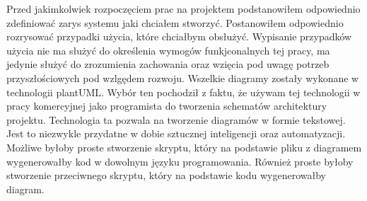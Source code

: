 Przed jakimkolwiek rozpoczęciem prac na projektem podstanowiłem odpowiednio zdefiniować zarys systemu jaki chciałem stworzyć.
Postanowiłem odpowiednio rozrysować przypadki użycia, które chciałbym obsłużyć.
Wypisanie przypadków użycia nie ma służyć do określenia wymogów funkjconalnych tej pracy, ma jedynie służyć do zrozumienia zachowania oraz wzięcia pod uwagę potrzeb przyszłościowych pod wzlgędem rozwoju.
Wszelkie diagramy zostały wykonane w technologii plantUML.
Wybór ten pochodził z faktu, że używam tej technologii w pracy komercyjnej jako programista do tworzenia schematów architektury projektu.
Technologia ta pozwala na tworzenie diagramów w formie tekstowej.
Jest to niezwykle przydatne w dobie sztucznej inteligencji oraz automatyzacji.
Możliwe byłoby proste stworzenie skryptu, który na podstawie pliku z diagramem wygenerowałby kod w dowolnym języku programowania.
Również proste byłoby stworzenie przeciwnego skryptu, który na podstawie kodu wygenerowałby diagram.


